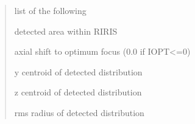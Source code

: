 \documentclass[letterpaper,10pt,english]{sphinxmanual}
\begin{document}
\begin{fulllineitems}
\begin{quote}
\begin{description}
\begin{DUlineblock}{0em}
\item[] list of the following
\item[]
\begin{DUlineblock}{\DUlineblockindent}
\item[]     detected area within RIRIS
\item[]    axial shift to optimum focus (0.0 if IOPT\textless{}=0)
\item[]     y centroid of detected distribution
\item[]     z centroid of detected distribution
\item[]      rms radius of detected distribution
\end{DUlineblock}
\end{DUlineblock}


\end{description}\end{quote}

\end{fulllineitems}

\end{document}
